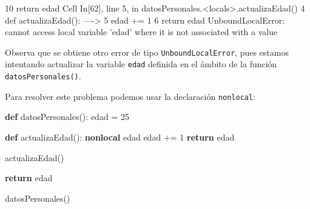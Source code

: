 \documentclass[
  spanish,
  letterpaper,
]{scrbook}
\newenvironment{Shaded}{\begin{snugshade}}{\end{snugshade}}
\newcommand{\ControlFlowTok}[1]{\textcolor[rgb]{0.00,0.23,0.31}{\textbf{#1}}}
\newcommand{\DecValTok}[1]{\textcolor[rgb]{0.68,0.00,0.00}{#1}}
\newcommand{\KeywordTok}[1]{\textcolor[rgb]{0.00,0.23,0.31}{\textbf{#1}}}
\newcommand{\NormalTok}[1]{\textcolor[rgb]{0.00,0.23,0.31}{#1}}
\newcommand{\OperatorTok}[1]{\textcolor[rgb]{0.37,0.37,0.37}{#1}}
\theoremstyle{definition}
\theoremstyle{remark}
\begin{document}
\begin{Highlighting}
\textcolor{QuartoInternalColor2}{}\textcolor{QuartoInternalColor4}{     10}\textcolor{QuartoInternalColor2}{ }\textcolor{QuartoInternalColor5}{return}\textcolor{QuartoInternalColor2}{ edad}
\textcolor{QuartoInternalColor2}{}\textcolor{QuartoInternalColor3}{Cell}\textcolor{QuartoInternalColor2}{}\textcolor{QuartoInternalColor3}{ }\textcolor{QuartoInternalColor2}{}\textcolor{QuartoInternalColor4}{In[62]}\textcolor{QuartoInternalColor2}{}\textcolor{QuartoInternalColor4}{, line 5}\textcolor{QuartoInternalColor2}{, in }\textcolor{QuartoInternalColor3}{datosPersonales.<locals>.actualizaEdad}\textcolor{QuartoInternalColor2}{}\textcolor{QuartoInternalColor10}{()}\textcolor{QuartoInternalColor2}{}
\textcolor{QuartoInternalColor2}{}\textcolor{QuartoInternalColor4}{      4}\textcolor{QuartoInternalColor2}{ }\textcolor{QuartoInternalColor5}{def}\textcolor{QuartoInternalColor2}{}\textcolor{QuartoInternalColor11}{ }\textcolor{QuartoInternalColor2}{}\textcolor{QuartoInternalColor10}{actualizaEdad}\textcolor{QuartoInternalColor2}{():}
\textcolor{QuartoInternalColor2}{}\textcolor{QuartoInternalColor4}{----> }\textcolor{QuartoInternalColor2}{}\textcolor{QuartoInternalColor4}{5}\textcolor{QuartoInternalColor2}{     }\textcolor{QuartoInternalColor2}{edad}\textcolor{QuartoInternalColor2}{ += }\textcolor{QuartoInternalColor4}{1}\textcolor{QuartoInternalColor2}{}
\textcolor{QuartoInternalColor2}{}\textcolor{QuartoInternalColor4}{      6}\textcolor{QuartoInternalColor2}{     }\textcolor{QuartoInternalColor5}{return}\textcolor{QuartoInternalColor2}{ edad}
\textcolor{QuartoInternalColor2}{}\textcolor{QuartoInternalColor1}{UnboundLocalError}\textcolor{QuartoInternalColor2}{: cannot access local variable 'edad' where it is not associated with a value}
\end{Highlighting}

Observa que se obtiene otro error de tipo \texttt{UnboundLocalError},
pues estamos intentando actualizar la variable \texttt{edad} definida en
el ámbito de la función \texttt{datosPersonales()}.

Para resolver este problema podemos usar la declaración
\texttt{nonlocal}:

\begin{Shaded}
\begin{Highlighting}[]
\KeywordTok{def}\NormalTok{ datosPersonales():}
\NormalTok{    edad }\OperatorTok{=} \DecValTok{25}

    \KeywordTok{def}\NormalTok{ actualizaEdad():}
        \KeywordTok{nonlocal}\NormalTok{ edad}
\NormalTok{        edad }\OperatorTok{+=} \DecValTok{1}
        \ControlFlowTok{return}\NormalTok{ edad}

\NormalTok{    actualizaEdad()}

    \ControlFlowTok{return}\NormalTok{ edad}

\NormalTok{datosPersonales()}
\end{Highlighting}
\end{Shaded}
\end{document}
